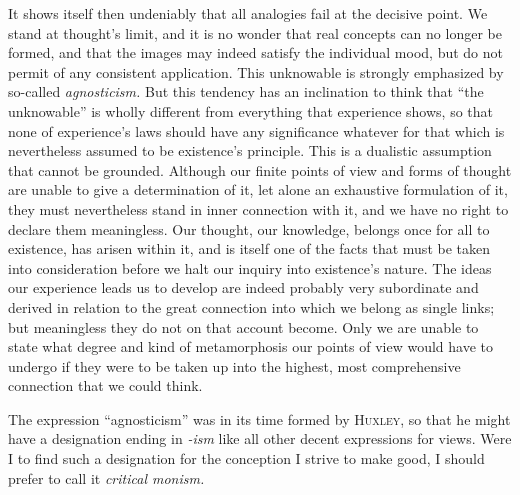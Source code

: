 \documentclass[12pt,a4paper]{book}
\newcommand{\opage}[1]{\marginnote{\footnotesize\textit{[#1]}}}
\begin{document}
It shows itself then undeniably that all analogies fail
at the decisive point. We stand at thought's limit, and it is no wonder that
real concepts can no longer be formed, and that the images may indeed satisfy
the individual mood, but do not permit of any consistent application. This
unknowable is strongly emphasized by so-called \emph{agnosticism.} But this
tendency has an inclination to think that ``the unknowable'' is wholly
different from everything that experience shows, so that none of experience's
laws should have any significance whatever for that which is nevertheless
assumed to be existence's principle. This is a dualistic assumption that
cannot be grounded. Although our finite points of view and forms of thought are
unable to give a determination of it, let alone an exhaustive formulation of
it, they must nevertheless stand in inner connection with it, and we have no
right to declare them meaningless. Our thought, our knowledge, belongs once
for all to existence, has arisen within it, and is itself one of the facts that
must be taken into consideration before we halt our inquiry into existence's
nature. The ideas our experience leads us to develop are indeed probably very
subordinate and derived in relation to the great connection into which we
belong as single links; but meaningless they do not on that account become. Only
we are unable to state what degree and kind of metamorphosis 
\opage{47}our points of view
would have to undergo if they were to be taken up into the highest, most
comprehensive connection that we could think.

The expression ``agnosticism'' was in its time formed by \textsc{Huxley}, so
that he might have a designation ending in \emph{-ism} like all other decent
expressions for views. Were I to find such a designation for the conception I
strive to make good, I should prefer to call it \emph{critical monism.}

\medskip
\end{document}

